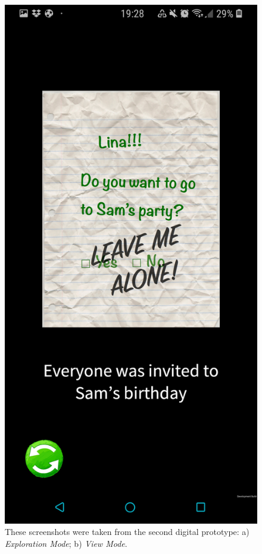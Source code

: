 \begin{figure}
    \includegraphics[scale = 0.07]{Screenshot_20190518-192847_LINA.jpg}
    \caption{These screenshots were taken from the second digital prototype: a) \textit{Exploration Mode}; b) \textit{View Mode}.}
    \label{fig:digital}
\end{figure}

